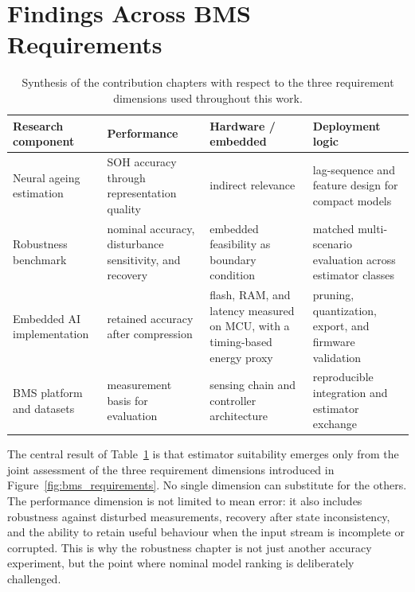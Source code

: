 \documentclass[
    a4paper,
    12pt,
    titlepage,
    bibliography=totoc,
    twoside=on,
    parskip=false,
    numbers=noenddot,
    cleardoublepage=empty,
    DIV=12,
    BCOR=12.0mm,
    headheight=36pt,
    headings=openright
]{scrreprt}
\begin{document}
\section{Findings Across BMS Requirements}
\begin{table}[H]
    \centering
    \small
    \caption[Synthesis of contribution chapters and requirement dimensions.]{Synthesis of the contribution chapters with respect to the three requirement dimensions used throughout this work.}
    \label{tab:synthesis_matrix}
    \begin{tabularx}{\textwidth}{>{\raggedright\arraybackslash}p{3.8cm}>{\raggedright\arraybackslash}p{2.7cm}>{\raggedright\arraybackslash}p{2.7cm}>{\raggedright\arraybackslash}X}
        \toprule
        Research component & Performance & Hardware / embedded & Deployment logic \\
        \midrule
        Neural ageing estimation & SOH accuracy through representation quality & indirect relevance & lag-sequence and feature design for compact models \\
        Robustness benchmark & nominal accuracy, disturbance sensitivity, and recovery & embedded feasibility as boundary condition & matched multi-scenario evaluation across estimator classes \\
        Embedded AI implementation & retained accuracy after compression & flash, RAM, and latency measured on MCU, with a timing-based energy proxy & pruning, quantization, export, and firmware validation \\
        BMS platform and datasets & measurement basis for evaluation & sensing chain and controller architecture & reproducible integration and estimator exchange \\
        \bottomrule
    \end{tabularx}
\end{table}

The central result of Table~\ref{tab:synthesis_matrix} is that estimator suitability emerges only from the joint assessment of the three requirement dimensions introduced in Figure~\ref{fig:bms_requirements}. No single dimension can substitute for the others. The performance dimension is not limited to mean error: it also includes robustness against disturbed measurements, recovery after state inconsistency, and the ability to retain useful behaviour when the input stream is incomplete or corrupted. This is why the robustness chapter is not just another accuracy experiment, but the point where nominal model ranking is deliberately challenged.
\end{document}
